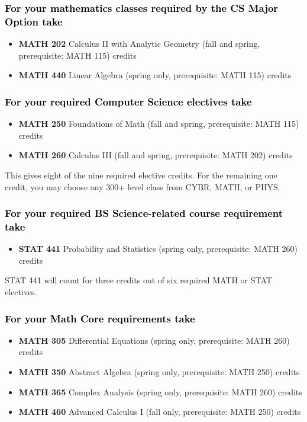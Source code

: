 \documentclass[10pt]{article}
\newenvironment{mypar}[2]
   {\begin{list}{}%
     {\setlength\leftmargin{#1}
     \setlength\rightmargin{#2}}
     \item[]}
   {\end{list}}
\newcommand{\calctwo}{\textbf{MATH 202} Calculus II with Analytic Geometry (fall and spring, prerequisite: MATH 115) \dotfill 5 credits }
\newcommand{\foundations}{\textbf{MATH 250} Foundations of Math (fall and spring, prerequisite: MATH 115)  \dotfill 3 credits}
\newcommand{\calcthree}{\textbf{MATH 260} Calculus III  (fall and spring, prerequisite: MATH 202) \dotfill 5 credits}
\newcommand{\linear}{\textbf{MATH 440} Linear Algebra (spring only, prerequisite: MATH 115) \dotfill 3 credits}
\newcommand{\statistics}{\textbf{STAT 441} Probability and Statistics (spring only, prerequisite: MATH 260)  \dotfill  3 credits}
\newcommand{\diffeq}{\textbf{MATH 305}	Differential Equations (spring only, prerequisite: MATH 260) \dotfill 	3 credits}
\newcommand{\abstractalgebra}{\textbf{MATH 350}	Abstract Algebra (spring only, prerequisite: MATH 250) \dotfill 	3 credits}
\newcommand{\complex}{\textbf{MATH 365}	Complex Analysis (spring only,  prerequisite: MATH 260) \dotfill 3 credits}
\newcommand{\advancedcalc}{\textbf{MATH 460}	Advanced Calculus I  (fall only,   prerequisite: MATH 250) \dotfill 3 credits}
\begin{document}
\subsubsection*{\textcolor{black}{For your mathematics classes required by the CS Major Option take}}
\begin{itemize}
\item \calctwo
\item \linear
\end{itemize}

\subsubsection*{\textcolor{black}{For your required Computer Science electives take}}

\begin{itemize}
\item \foundations
\item  \calcthree
\end{itemize}
\begin{mypar}{0.5cm}{0.5cm} This gives eight of the nine required elective credits. For the remaining one credit, you may choose any 300+ level class from CYBR,  MATH, or PHYS.
\end{mypar}

\subsubsection*{\textcolor{black}{For your required BS Science-related course requirement take}}
\begin{itemize}
\item \statistics
\end{itemize}
\begin{mypar}{0.5cm}{0.5cm} STAT 441 will count for three credits out of six required MATH or STAT electives.
\end{mypar}

\subsubsection*{\textcolor{black}{For your Math Core requirements take}}

\begin{itemize}
  \item \diffeq
  \item \abstractalgebra
  \item \complex
  \item \advancedcalc
\end{itemize}
\end{document}
